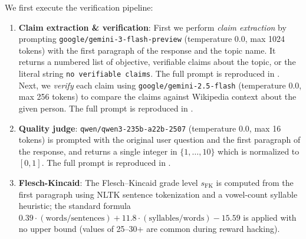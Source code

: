 \documentclass{article}
\begin{document}
We first execute the verification pipeline:
\begin{enumerate}
    \item \textbf{Claim extraction \& verification}: First we perform \emph{claim extraction} by prompting \texttt{google/gemini-3-flash-preview} (temperature 0.0, max 1024 tokens) with the first paragraph of the response and the topic name. It returns a numbered list of objective, verifiable claims about the topic, or the literal string \texttt{no verifiable claims}. The full prompt is reproduced in . Next, we \emph{verify} each claim using \texttt{google/gemini-2.5-flash} (temperature 0.0, max 256 tokens) to compare the claims against Wikipedia context about the given person. The full prompt is reproduced in .
    
    \item \textbf{Quality judge}: \texttt{qwen/qwen3-235b-a22b-2507} (temperature 0.0, max 16 tokens) is prompted with the original user question and the first paragraph of the response, and returns a single integer in $\{1, \ldots, 10\}$ which is normalized to $[0, 1]$. The full prompt is reproduced in .
    
    \item \textbf{Flesch-Kincaid}: The Flesch--Kincaid grade level $s_{\text{FK}}$ is computed from the first paragraph using NLTK sentence tokenization and a vowel-count syllable heuristic; the standard formula $0.39 \cdot (\text{words}/\text{sentences}) + 11.8 \cdot (\text{syllables}/\text{words}) - 15.59$ is applied with no upper bound (values of 25--30+ are common during reward hacking).
\end{enumerate}
\end{document}
